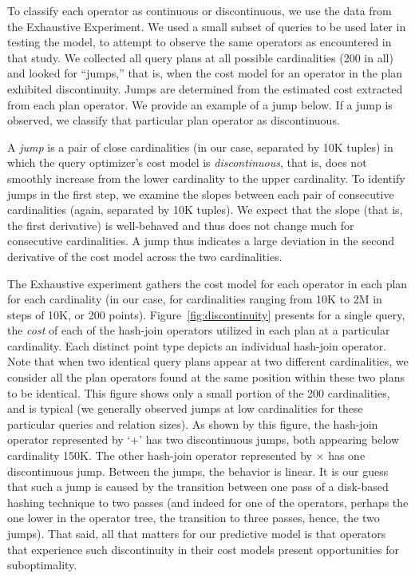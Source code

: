 \documentclass[prodmode,acmtods]{acmsmall}
\begin{document}
To classify each operator as continuous or discontinuous, we use the data
from the Exhaustive Experiment. We
used a small subset of queries to be used later in testing the model, to
attempt to observe the same operators as encountered in that
study. We
collected all query plans at all possible cardinalities (200 in all) and
looked for ``jumps,'' that is, when the cost model for an operator in the
plan exhibited discontinuity. Jumps are determined from the estimated cost
extracted from each plan operator. We provide an example of a jump below. If
a jump is observed, we classify that particular plan operator as
discontinuous.

A {\em jump} is a pair of close cardinalities (in our case, separated by 10K
tuples) in which the query optimizer's cost model is {\em discontinuous},
that is, does not smoothly increase from the lower cardinality to the upper
cardinality. To identify jumps in the first step, we examine the slopes
between each pair of consecutive cardinalities (again, separated by 10K
tuples). We expect that the slope (that is, the first derivative) is
well-behaved and thus does not change much for consecutive cardinalities. 
A jump thus indicates a large deviation in the second derivative of the 
cost model across the two cardinalities.

The Exhaustive experiment gathers the cost model for each operator in each
plan for each cardinality (in our case, for cardinalities ranging from 10K
to 2M in steps of 10K, or 200 points).  Figure~\ref{fig:discontinuity}
presents for a single query, the {\em cost} of each of the hash-join operators utilized in
each plan at a particular cardinality. Each distinct point type depicts an
individual hash-join operator. Note that when two identical query plans
appear at two different cardinalities, we consider all the plan operators
found at the same position within these two plans to be identical. This
figure shows only a small portion of the 200 cardinalities, and is typical
(we generally observed jumps at low cardinalities for these particular queries and
relation sizes).  As shown by this figure, the hash-join operator
represented by `+' has two discontinuous jumps, both appearing below
cardinality 150K. The other hash-join operator represented by $\times$ has one
discontinuous jump.  Between the jumps, the behavior is linear. It is our
guess that
such a jump is caused by the transition between one pass of a disk-based hashing
technique to two passes (and indeed for one of the operators, perhaps the one
lower in the operator tree, the transition to three passes, hence, the two
jumps). That said, all
that matters for our predictive model is that operators that experience
such discontinuity in their cost models present opportunities for
suboptimality.
\end{document}
